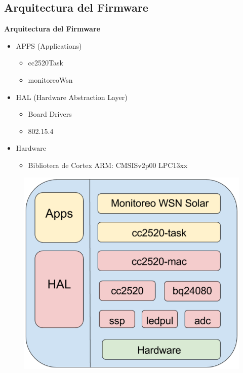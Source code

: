 \documentclass[aspectratio=43, handout]{beamer}
\begin{document}
\subsection[Arquitectura]{Arquitectura del Firmware}
\begin{frame}{\textbf{\LARGE{Arquitectura del Firmware}}}
\fontsize{14pt}{14}\selectfont
\begin{minipage}[c]{1.0\linewidth}
	\begin{minipage}[c]{0.4\linewidth}
		\begin{itemize}
			\item APPS (Applications)
			\begin{itemize}
			\item cc2520Task
			\item monitoreoWsn
			\vspace{10px}
			\end{itemize}
			\item HAL (Hardware Abstraction Layer)
			\begin{itemize}
			\item Board Drivers
			\item 802.15.4
			\vspace{10px}
			\end{itemize}						
			\item Hardware
			\begin{itemize}
			\item Biblioteca de Cortex ARM: CMSISv2p00 LPC13xx
			\end{itemize}
		\end{itemize}	
	  \end{minipage}
	  \begin{minipage}[c]{0.4\linewidth}
		\begin{figure}[H]
			{\includegraphics[width=1.5\textwidth]{./imagenes/arqcolor.PNG}}
		\end{figure}	  	  	
	  \end{minipage}
\end{minipage}


\end{frame}
\end{document}
